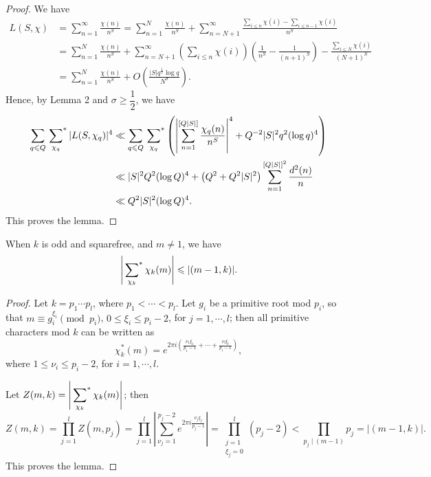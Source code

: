 \begin{proof}
We have
\begin{align*}
L(S,\chi)
&=\sum_{n=1}^{\infty}\frac{\chi(n)}{n^S}
=\sum_{n=1}^{N}\frac{\chi(n)}{n^S}
+\sum_{n=N+1}^{\infty}
\frac{\sum_{i\leqslant n}\chi(i)-\sum_{i\leqslant n-1}\chi(i)}{n^S}\\
&=\sum_{n=1}^{N}\frac{\chi(n)}{n^S}
+\sum_{n=N+1}^{\infty}
\left(\sum_{i\leqslant n}\chi(i)\right)
\left(\frac{1}{n^S}-\frac{1}{(n+1)^S}\right)
-\frac{\sum_{i\leqslant N}\chi(i)}{(N+1)^S}\\
&=\sum_{n=1}^{N}\frac{\chi(n)}{n^S}
+O\left(\frac{|S|q^{\frac12}\log q}{N^\sigma}\right).
\end{align*}
Hence, by Lemma 2 and $\sigma\geqslant\dfrac12$, we have
\begin{align*}
\sum_{q\leqslant Q}\sideset{}{^*}\sum_{\chi_q}|L(S,\chi_q)|^4
&\ll\sum_{q\leqslant Q}\sideset{}{^*}\sum_{\chi_q}
\left(\left|\sum_{n=1}^{[Q|S|]}\frac{\chi_q(n)}{n^S}\right|^4
+Q^{-2}|S|^2q^2(\log q)^4\right)\\
&\ll|S|^2Q^2(\log Q)^4
+\left(Q^2+Q^2|S|^2\right)\sum_{n=1}^{[Q|S|]^2}\frac{d^2(n)}{n}\\
&\ll Q^2|S|^2(\log Q)^4.
\end{align*}
This proves the lemma.
\end{proof}

\begin{lemma}
When $k$ is odd and squarefree, and $m\neq1$, we have
\[
\left|\sideset{}{^*}\sum_{\chi_k}\chi_k(m)\right|
\leqslant|(m-1,k)|.
\]
\end{lemma}

\begin{proof}
Let $k=p_1\cdots p_l$, where $p_1<\cdots<p_l$. Let $g_i$ be a primitive root mod $p_i$, so that $m\equiv g_i^{\xi_i}\pmod{p_i}$, $0\leqslant\xi_i\leqslant p_i-2$, for $j=1,\cdots,l$; then all primitive characters mod $k$ can be written as
\[
\chi_k^*(m)=e^{2\pi i\left(\frac{\nu_1\xi_1}{p_1-1}+\cdots+\frac{\nu_l\xi_l}{p_l-1}\right)},
\]
where $1\leqslant\nu_i\leqslant p_i-2$, for $i=1,\cdots,l$.

Let $\displaystyle Z(m,k)=\left|\sideset{}{^*}\sum_{\chi_k}\chi_k(m)\right|$; then
\[
Z(m,k)=\prod_{j=1}^{l}Z(m,p_j)
=\prod_{j=1}^{l}\left|\sum_{\nu_j=1}^{p_j-2}
e^{2\pi i\frac{\nu_j\xi_j}{p_j-1}}\right|
=\prod_{\substack{j=1\\\xi_j=0}}^{l}(p_j-2)
<\prod_{p_j\mid(m-1)}p_j
=|(m-1,k)|.
\]
This proves the lemma.
\end{proof}

